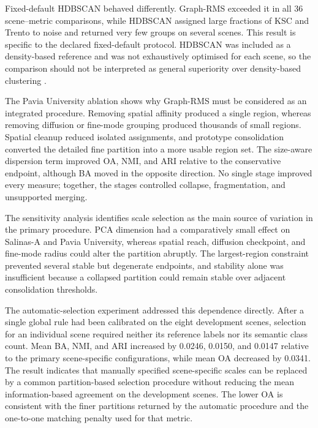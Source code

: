 \documentclass[10pt,a4paper,fleqn]{article}
\begin{document}
Fixed-default HDBSCAN behaved differently. Graph-RMS exceeded it in all 36
scene--metric comparisons, while HDBSCAN assigned large fractions of KSC and
Trento to noise and returned very few groups on several scenes. This result is
specific to the declared fixed-default protocol. HDBSCAN was included as a
density-based reference and was not exhaustively optimised for each scene, so
the comparison should not be interpreted as general superiority over
density-based clustering \citep{campello2013}.

The Pavia University ablation shows why Graph-RMS must be considered as an
integrated procedure. Removing spatial affinity produced a single region,
whereas removing diffusion or fine-mode grouping produced thousands of small
regions. Spatial cleanup reduced isolated assignments, and prototype
consolidation converted the detailed fine partition into a more usable region
set. The size-aware dispersion term improved OA, NMI, and ARI relative to the
conservative endpoint, although BA moved in the opposite direction. No single
stage improved every measure; together, the stages controlled collapse,
fragmentation, and unsupported merging.

The sensitivity analysis identifies scale selection as the main source of
variation in the primary procedure. PCA dimension had a comparatively small
effect on Salinas-A and Pavia University, whereas spatial reach, diffusion
checkpoint, and fine-mode radius could alter the partition abruptly. The
largest-region constraint prevented several stable but degenerate endpoints,
and stability alone was insufficient because a collapsed partition could
remain stable over adjacent consolidation thresholds.

The automatic-selection experiment addressed this dependence directly. After
a single global rule had been calibrated on the eight development scenes,
selection for an individual scene required neither its reference labels nor
its semantic class count. Mean BA, NMI, and ARI increased by 0.0246, 0.0150,
and 0.0147 relative to the primary scene-specific configurations, while mean
OA decreased by 0.0341. The result indicates that manually specified
scene-specific scales can be replaced by a common partition-based selection
procedure without reducing the mean information-based agreement on the
development scenes. The lower OA is consistent with the finer partitions
returned by the automatic procedure and the one-to-one matching penalty used
for that metric.
\end{document}
